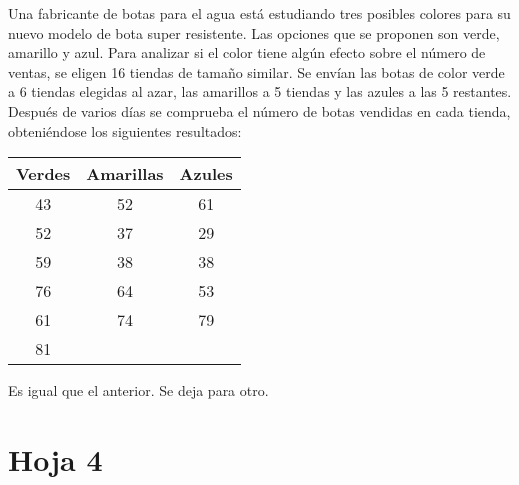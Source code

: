 \begin{problem}[17]
Una fabricante de botas para el agua está estudiando tres posibles colores para su nuevo modelo de bota super resistente. Las opciones que se proponen son verde, amarillo y azul. Para analizar si el color tiene algún efecto sobre el número de ventas, se eligen 16 tiendas de tamaño similar. Se envían las botas de color verde a 6 tiendas elegidas al azar, las amarillos a 5 tiendas y las azules a las 5 restantes. Después de varios días se comprueba el número de botas vendidas en cada tienda, obteniéndose los siguientes resultados:
\begin{center}
\begin{tabular}{ccc}
Verdes&Amarillas&Azules\\\hline
43&52&61\\
52&37&29\\
59&38&38\\
76&64&53\\
61&74&79\\
81&&
\end{tabular}
\end{center}

\solution
Es igual que el anterior. Se deja para otro.

\end{problem}


\section{Hoja 4}

